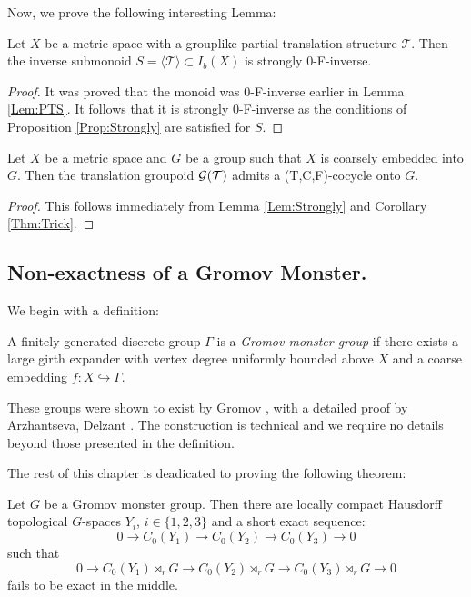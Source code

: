 \begin{example}
Now, we prove the following interesting Lemma:

\begin{lemma}\label{Lem:Strongly}
Let $X$ be a metric space with a grouplike partial translation structure $\mathcal{T}$. Then the inverse submonoid $S=\langle \mathcal{T} \rangle \subset I_{b}(X)$ is strongly $0$-F-inverse.
\end{lemma}
\begin{proof}
It was proved that the monoid was $0$-F-inverse earlier in Lemma \ref{Lem:PTS}. It follows that it is strongly $0$-F-inverse as the conditions of Proposition \ref{Prop:Strongly} are satisfied for $S$.
\end{proof}

\begin{proposition}\label{Prop:Cocycle}
Let $X$ be a metric space and $G$ be a group such that $X$ is coarsely embedded into $G$. Then the translation groupoid $\mathcal{G}(\mathcal{T})$ admits a (T,C,F)-cocycle onto $G$.
\end{proposition}
\begin{proof}
This follows immediately from Lemma \ref{Lem:Strongly} and Corollary \ref{Thm:Trick}.
\end{proof}

\subsection{Non-exactness of a Gromov Monster.}
We begin with a definition:
\begin{definition}
A finitely generated discrete group $\Gamma$ is a \textit{Gromov monster group} if there exists a large girth expander with vertex degree uniformly bounded above $X$ and a coarse embedding $f: X \hookrightarrow \Gamma$. 
\end{definition}

These groups were shown to exist by Gromov \cite{MR1978492}, with a detailed proof by Arzhantseva, Delzant \cite{exrangrps}. The construction is technical and we require no details beyond those presented in the definition.

The rest of this chapter is deadicated to proving the following theorem:

\begin{thm}
Let $G$ be a Gromov monster group. Then there are locally compact Hausdorff topological $G$-spaces $Y_{i}$, $i \in \lbrace 1,2,3 \rbrace$ and a short exact sequence:
\begin{equation*}
0 \rightarrow C_{0}(Y_{1}) \rightarrow C_{0}(Y_{2}) \rightarrow C_{0}(Y_{3}) \rightarrow 0
\end{equation*}
such that
\begin{equation*}
0 \rightarrow C_{0}(Y_{1})\rtimes_{r} G \rightarrow C_{0}(Y_{2})\rtimes_{r} G \rightarrow C_{0}(Y_{3})\rtimes_{r} G \rightarrow 0
\end{equation*}
fails to be exact in the middle.
\end{thm}


\end{example}
